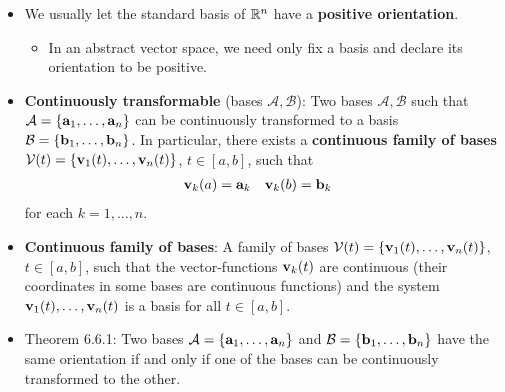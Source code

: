 \documentclass[../../notes.tex]{subfiles}
\begin{document}
\begin{itemize}
    \item We usually let the standard basis of $\mathbb{R}^n$ have a \textbf{positive orientation}.
    \begin{itemize}
        \item In an abstract vector space, we need only fix a basis and declare its orientation to be positive.
    \end{itemize}
    \item \textbf{Continuously transformable} (bases $\mathcal{A},\mathcal{B}$): Two bases $\mathcal{A},\mathcal{B}$ such that $\mathcal{A}=\{\mathbf{a}_1,\dots,\mathbf{a}_n\}$ can be continuously transformed to a basis $\mathcal{B}=\{\mathbf{b}_1,\dots,\mathbf{b}_n\}$. In particular, there exists a \textbf{continuous family of bases} $\mathcal{V}(t)=\{\mathbf{v}_1(t),\dots,\mathbf{v}_n(t)\}$, $t\in[a,b]$, such that
    \begin{align*}
        \mathbf{v}_k(a) &= \mathbf{a}_k&
        \mathbf{v}_k(b) &= \mathbf{b}_k
    \end{align*}
    for each $k=1,\dots,n$.
    \item \textbf{Continuous family of bases}: A family of bases $\mathcal{V}(t)=\{\mathbf{v}_1(t),\dots,\mathbf{v}_n(t)\}$, $t\in[a,b]$, such that the vector-functions $\mathbf{v}_k(t)$ are continuous (their coordinates in some bases are continuous functions) and the system $\mathbf{v}_1(t),\dots,\mathbf{v}_n(t)$ is a basis for all $t\in[a,b]$.
    \item Theorem 6.6.1: Two bases $\mathcal{A}=\{\mathbf{a}_1,\dots,\mathbf{a}_n\}$ and $\mathcal{B}=\{\mathbf{b}_1,\dots,\mathbf{b}_n\}$ have the same orientation if and only if one of the bases can be continuously transformed to the other.
\end{itemize}
\end{document}
